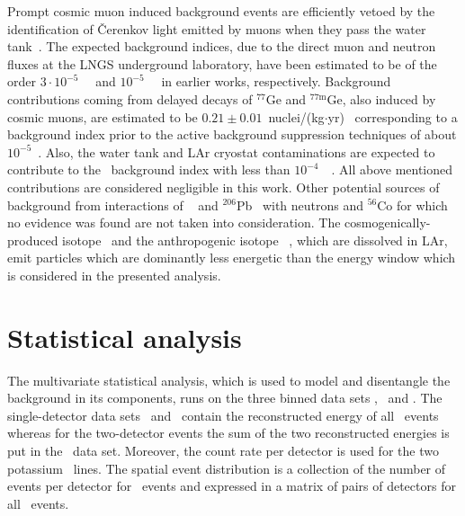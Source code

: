 Prompt cosmic muon induced background events are efficiently vetoed by the identification
of \v{C}erenkov light emitted by muons when they pass the water tank~\cite{Agostini2013a}.
The expected background indices, due to the direct muon and neutron fluxes at the LNGS underground
laboratory, have been estimated to be of the order $3 \cdot
10^{-5}$~\ctsper~\cite{Freund2014} and $10^{-5}$~\ctsper~\cite{Meierhofer2012} in earlier
works, respectively.  Background contributions coming from delayed decays of $^{77}$Ge and
$^{77\text{m}}$Ge, also induced by cosmic muons, are estimated to be $0.21 \pm
0.01$~nuclei/(kg$\cdot$yr)~\cite{Wiesinger2018} corresponding to a background index prior to the active
background suppression techniques of about $10^{-5}$~\ctsper. Also, the water tank and LAr
cryostat contaminations are expected to contribute to the \gerda\ background index with less than
$10^{-4}$~\ctsper~\cite{Ackermann2012, Barabanov2009}. All above mentioned contributions
are considered negligible in this work. Other potential sources of background from
interactions of \gesix~\cite{Meierhofer2012, Vanhoefen2018} and $^{206}$Pb~\cite{Mei2007}
with neutrons and $^{56}$Co for which no evidence was found are not taken into
consideration. The cosmogenically-produced isotope \Arl\ and the anthropogenic isotope
\Kr~\cite{Winger2005}, which are dissolved in LAr, emit particles which are dominantly
less energetic than the energy window which is considered in the presented analysis.

\section{Statistical analysis}%
\label{sec:bkg:raw:ph2:stat}

The multivariate statistical analysis, which is used to model and disentangle the
background in its components, runs on the three binned data sets \enrBEGeII, \enrCoaxII\
and \enrGeII. The single-detector data sets \enrBEGeII\ and \enrCoaxII\ contain the
reconstructed energy of all \Mone\ events whereas for the two-detector events the sum of
the two reconstructed energies is put in the \enrGeII\ data set. Moreover, the count rate
per detector is used for the two potassium \g\ lines.  The spatial event distribution is a
collection of the number of events per detector for \Mone\ events and expressed in a
matrix of pairs of detectors for all \Mtwo\ events.

